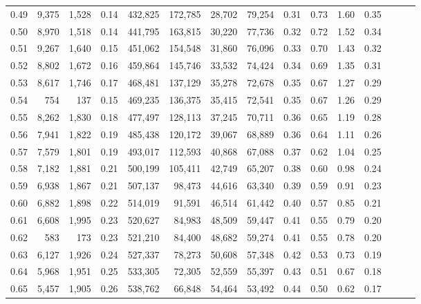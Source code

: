 \begin{tabular}{rrrrrrrrrrrrrrr}
0.49 &   9,375 &  1,528 &  0.14 &  432,825 &  172,785 &   28,702 &   79,254 &  0.31 &  0.73 &  1.60 &      0.35 \\
0.50 &   8,970 &  1,518 &  0.14 &  441,795 &  163,815 &   30,220 &   77,736 &  0.32 &  0.72 &  1.52 &      0.34 \\
0.51 &   9,267 &  1,640 &  0.15 &  451,062 &  154,548 &   31,860 &   76,096 &  0.33 &  0.70 &  1.43 &      0.32 \\
0.52 &   8,802 &  1,672 &  0.16 &  459,864 &  145,746 &   33,532 &   74,424 &  0.34 &  0.69 &  1.35 &      0.31 \\
0.53 &   8,617 &  1,746 &  0.17 &  468,481 &  137,129 &   35,278 &   72,678 &  0.35 &  0.67 &  1.27 &      0.29 \\
0.54 &     754 &    137 &  0.15 &  469,235 &  136,375 &   35,415 &   72,541 &  0.35 &  0.67 &  1.26 &      0.29 \\
0.55 &   8,262 &  1,830 &  0.18 &  477,497 &  128,113 &   37,245 &   70,711 &  0.36 &  0.65 &  1.19 &      0.28 \\
0.56 &   7,941 &  1,822 &  0.19 &  485,438 &  120,172 &   39,067 &   68,889 &  0.36 &  0.64 &  1.11 &      0.26 \\
0.57 &   7,579 &  1,801 &  0.19 &  493,017 &  112,593 &   40,868 &   67,088 &  0.37 &  0.62 &  1.04 &      0.25 \\
0.58 &   7,182 &  1,881 &  0.21 &  500,199 &  105,411 &   42,749 &   65,207 &  0.38 &  0.60 &  0.98 &      0.24 \\
0.59 &   6,938 &  1,867 &  0.21 &  507,137 &   98,473 &   44,616 &   63,340 &  0.39 &  0.59 &  0.91 &      0.23 \\
0.60 &   6,882 &  1,898 &  0.22 &  514,019 &   91,591 &   46,514 &   61,442 &  0.40 &  0.57 &  0.85 &      0.21 \\
0.61 &   6,608 &  1,995 &  0.23 &  520,627 &   84,983 &   48,509 &   59,447 &  0.41 &  0.55 &  0.79 &      0.20 \\
0.62 &     583 &    173 &  0.23 &  521,210 &   84,400 &   48,682 &   59,274 &  0.41 &  0.55 &  0.78 &      0.20 \\
0.63 &   6,127 &  1,926 &  0.24 &  527,337 &   78,273 &   50,608 &   57,348 &  0.42 &  0.53 &  0.73 &      0.19 \\
0.64 &   5,968 &  1,951 &  0.25 &  533,305 &   72,305 &   52,559 &   55,397 &  0.43 &  0.51 &  0.67 &      0.18 \\
0.65 &   5,457 &  1,905 &  0.26 &  538,762 &   66,848 &   54,464 &   53,492 &  0.44 &  0.50 &  0.62 &      0.17 \\

\end{tabular}

